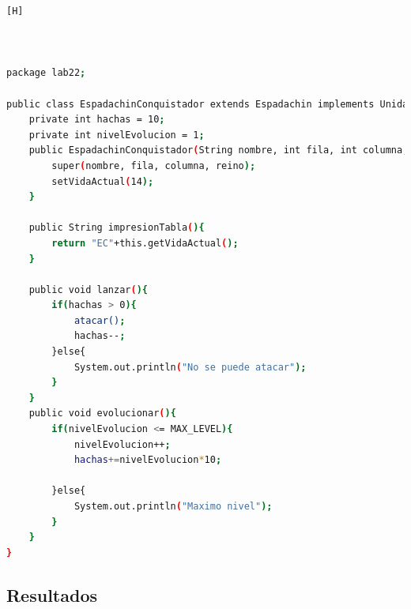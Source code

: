 \documentclass{article}
\begin{document}
	
	
	
\begin{lstlisting}[language=bash,caption={CLASE EspadachinConquistador}][H]
	


package lab22;

public class EspadachinConquistador extends Espadachin implements UnidadEspecial{
    private int hachas = 10;
    private int nivelEvolucion = 1; 
    public EspadachinConquistador(String nombre, int fila, int columna, int reino){
        super(nombre, fila, columna, reino);
		setVidaActual(14);
    }

    public String impresionTabla(){
        return "EC"+this.getVidaActual();
    }

    public void lanzar(){
        if(hachas > 0){
            atacar();
            hachas--;
        }else{
            System.out.println("No se puede atacar");
        }
    }
    public void evolucionar(){
        if(nivelEvolucion <= MAX_LEVEL){
            nivelEvolucion++;
            hachas+=nivelEvolucion*10;

        }else{
            System.out.println("Maximo nivel");
        }
    }
}

	\end{lstlisting}
	\subsection{Resultados}
	
\end{document}
